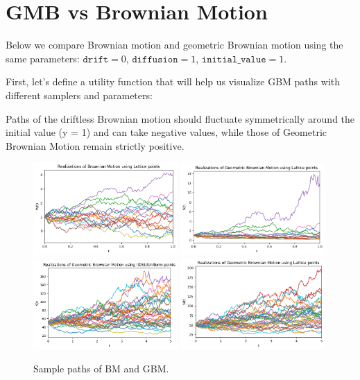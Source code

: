 \documentclass{article}
\begin{document}
\section{GMB vs Brownian Motion}

Below we compare Brownian motion and geometric Brownian motion using the same parameters: $\texttt{drift} = 0$, $\texttt{diffusion} = 1$, $\texttt{initial\_value} = 1$.

First, let's define a utility function that will help us visualize GBM paths with different samplers and parameters:



Paths of the driftless Brownian motion should fluctuate symmetrically around the initial value (y = 1) and can take negative values, while those of Geometric Brownian Motion remain strictly positive.



\begin{figure}[t!]
\centering
\includegraphics[width=0.49\textwidth]{images/figure_1.png}
\includegraphics[width=0.49\textwidth]{images/figure_2.png}\\
\includegraphics[width=0.49\textwidth]{images/figure_3.png}
\includegraphics[width=0.49\textwidth]{images/figure_4.png}
\caption{Sample paths of BM and GBM.}
\end{figure}
\end{document}
